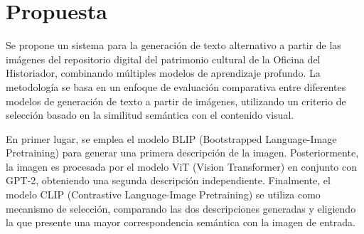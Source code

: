 \chapter{Propuesta}\label{chapter:propuesta}
Se propone un sistema para la generación de texto alternativo a partir de las imágenes del repositorio digital del patrimonio cultural de la Oficina del Historiador, combinando múltiples modelos de aprendizaje profundo. La metodología se basa en un enfoque de evaluación comparativa entre diferentes modelos de generación de texto a partir de imágenes, utilizando un criterio de selección basado en la similitud semántica con el contenido visual.

En primer lugar, se emplea el modelo BLIP (Bootstrapped Language-Image Pretraining) para generar una primera descripción de la imagen. Posteriormente, la imagen es procesada por el modelo ViT (Vision Transformer) en conjunto con GPT-2, obteniendo una segunda descripción independiente. Finalmente, el modelo CLIP (Contrastive Language-Image Pretraining) se utiliza como mecanismo de selección, comparando las dos descripciones generadas y eligiendo la que presente una mayor correspondencia semántica con la imagen de entrada.